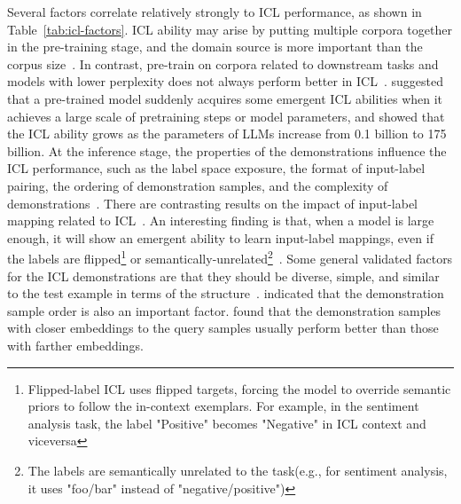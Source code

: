 Several factors correlate relatively strongly to ICL performance, as shown in Table~\ref{tab:icl-factors}.
ICL ability may arise by putting multiple corpora together in the pre-training stage, and the domain source is more important than the corpus size~\cite{shin2022effect}.
In contrast, pre-train on corpora related to downstream tasks and models with lower perplexity does not always perform better in ICL~\cite{shin2022effect}.
\textcite{wei2022emergent} suggested that a pre-trained model suddenly acquires some emergent ICL abilities when it achieves a large scale of pretraining steps or model parameters, and \textcite{brown2020language} showed that the ICL ability grows as the parameters of LLMs increase from 0.1 billion to 175 billion.
At the inference stage, the properties of the demonstrations influence the ICL performance, such as the label space exposure, the format of input-label pairing, the ordering of demonstration samples, and the complexity of demonstrations~\cite{min2022rethinking, an2023how, lu2022fantastically}.
There are contrasting results on the impact of input-label mapping related to ICL~\cite{min2022rethinking, yoo2022groundtruth}.
An interesting finding is that, when a model is large enough, it will show an emergent ability to learn input-label mappings, even if the labels are flipped\footnote{Flipped-label ICL uses flipped targets, forcing the model to override semantic priors to follow the in-context exemplars. For example, in the sentiment analysis task, the label "Positive" becomes "Negative" in ICL context and viceversa} or semantically-unrelated\footnote{The labels are semantically unrelated to the task(e.g., for sentiment analysis, it uses "foo/bar" instead of "negative/positive")}~\cite{wei2023larger}.
Some general validated factors for the ICL demonstrations are that they should be diverse, simple, and similar to the test example in terms of the structure~\cite{an2023how}.
\textcite{lu2022fantastically} indicated that the demonstration sample order is also an important factor.
\textcite{liu2022good} found that the demonstration samples with closer embeddings to the query samples usually perform better than those with farther embeddings.

